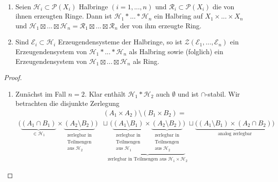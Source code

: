 \begin{proposition} \
\begin{enumerate}[(\roman*),topsep=5pt]
	\item Seien $\mathcal{H}_i \subset \mathcal{P}(X_i)$ Halbringe $(i=1,...,n)$ und $\mathcal{R}_i \subset \mathcal{P}(X_i)$ die von ihnen erzeugten Ringe. Dann ist $\mathcal{H}_1 \ast ... \ast \mathcal{H}_n$ ein Halbring auf $X_1 \times ... \times X_n$ und $\mathcal{H}_1 \boxtimes ... \boxtimes \mathcal{H}_n =\mathcal{R}_1 \boxtimes ... \boxtimes \mathcal{R}_n$ der von ihm erzeugte Ring.
	\item Sind $\mathcal{E}_i \subset \mathcal{H}_i$ Erzeugendensysteme der Halbringe, so ist $\mathcal{Z}(\mathcal{E}_1,...,\mathcal{E}_n)$ ein Erzeugendensystem von $\mathcal{H}_1 \ast ... \ast \mathcal{H}_n$ als Halbring sowie (folglich) ein Erzeugendensystem von $\mathcal{H}_1 \boxtimes ... \boxtimes \mathcal{H}_n$ als Ring.
\end{enumerate}
\label{propC}
\begin{proof} \
\begin{enumerate}[(\roman*),topsep=5pt]
	\item Zunächst im Fall $n=2$. Klar enthält $\mathcal{H}_1 \ast \mathcal{H}_2$ auch $\emptyset$ und ist $\cap$-stabil. Wir betrachten die disjunkte Zerlegung
	\begin{equation}
	\begin{split}
		&(A_1 \times A_2) \setminus (B_1 \times B_2) =\\
	 \big( \underbrace{(A_1 \cap B_1)}_{\in \mathcal{H}_1} \times \underbrace{(A_2 \setminus B_2)}_{\substack{\text{zerlegbar in} \\ \text{Teilmengen}\\ \text{aus }\mathcal{H}_2}} \big) & \sqcup \underbrace{\big( \underbrace{(A_1 \setminus B_1)}_{\substack{\text{zerlegbar in} \\ \text{Teilmengen}\\ \text{aus }\mathcal{H}_1}} \times \underbrace{(A_2 \setminus B_2)}_{\substack{\text{zerlegbar in} \\ \text{Teilmengen}\\ \text{aus }\mathcal{H}_2}} \big)}_{\text{zerlegbar in Teilmengen aus } \mathcal{H}_1 \times \mathcal{H}_2}
		\sqcup \underbrace{\big( (A_1 \setminus B_1) \times (A_2 \cap B_2)\big)}_{\text{analog zerlegbar}}
	\end{split}
	\end{equation}

\end{enumerate}
\end{proof}
\end{proposition}
